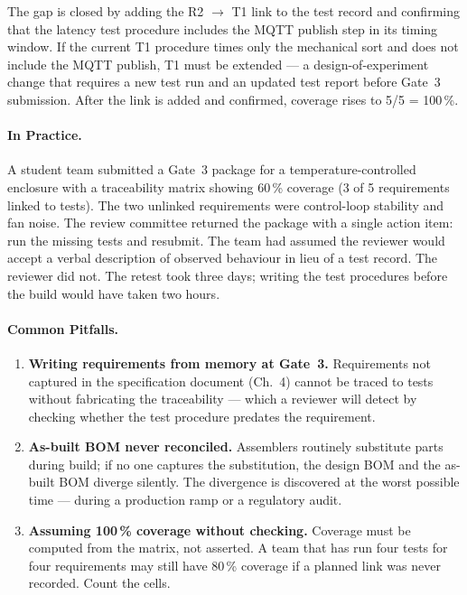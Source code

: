 The gap is closed by adding the R2 $\to$ T1 link to the test record and
confirming that the latency test procedure includes the MQTT publish step in its
timing window.
If the current T1 procedure times only the mechanical sort and does not include
the MQTT publish, T1 must be extended --- a design-of-experiment change that
requires a new test run and an updated test report before Gate~3 submission.
After the link is added and confirmed, coverage rises to 5/5 = 100\,\%.

\paragraph{In Practice.}
A student team submitted a Gate~3 package for a temperature-controlled
enclosure with a traceability matrix showing 60\,\% coverage (3 of 5
requirements linked to tests).
The two unlinked requirements were control-loop stability and fan noise.
The review committee returned the package with a single action item: run the
missing tests and resubmit.
The team had assumed the reviewer would accept a verbal description of observed
behaviour in lieu of a test record.
The reviewer did not.
The retest took three days; writing the test procedures before the build would
have taken two hours.

\paragraph{Common Pitfalls.}
\begin{enumerate}
  \item[(a)] \textbf{Writing requirements from memory at Gate~3.}
        Requirements not captured in the specification document (Ch.~4) cannot
        be traced to tests without fabricating the traceability --- which a
        reviewer will detect by checking whether the test procedure predates the
        requirement.

  \item[(b)] \textbf{As-built BOM never reconciled.}
        Assemblers routinely substitute parts during build; if no one captures
        the substitution, the design BOM and the as-built BOM diverge silently.
        The divergence is discovered at the worst possible time --- during a
        production ramp or a regulatory audit.

  \item[(c)] \textbf{Assuming 100\,\% coverage without checking.}
        Coverage must be computed from the matrix, not asserted.
        A team that has run four tests for four requirements may still have
        80\,\% coverage if a planned link was never recorded.
        Count the cells.
\end{enumerate}

